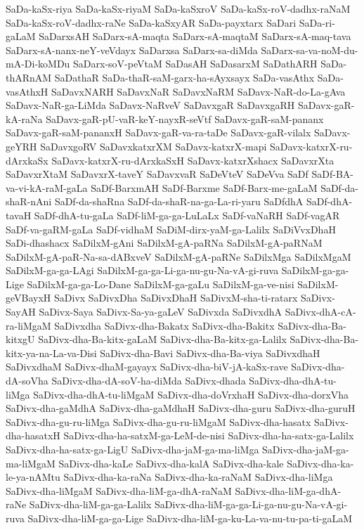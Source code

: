 {SaDa-kaSx-riya
SaDa-kaSx-riyaM
SaDa-kaSxroV
SaDa-kaSx-roV-dadhx-raNaM
SaDa-kaSx-roV-dadhx-raNe
SaDa-kaSxyAR
SaDa-payxtarx
SaDari
SaDa-ri-gaLaM
SaDarxsAH
SaDarx-sA-maqta
SaDarx-sA-maqtaM
SaDarx-sA-maq-tava
SaDarx-sA-nanx-neY-veVdayx
SaDarxsa
SaDarx-sa-diMda
SaDarx-sa-va-noM-du-mA-Di-koMDu
SaDarx-soV-peVtaM
SaDasAH
SaDasarxM
SaDathARH
SaDa-thARnAM
SaDathaR
SaDa-thaR-saM-garx-ha-sAyxsayx
SaDa-vasAthx
SaDa-vasAthxH
SaDavxNARH
SaDavxNaR
SaDavxNaRM
SaDavx-NaR-do-La-gAva
SaDavx-NaR-ga-LiMda
SaDavx-NaRveV
SaDavxgaR
SaDavxgaRH
SaDavx-gaR-kA-raNa
SaDavx-gaR-pU-vaR-keY-nayxR-seVtf
SaDavx-gaR-saM-pananx
SaDavx-gaR-saM-pananxH
SaDavx-gaR-va-ra-taDe
SaDavx-gaR-vilalx
SaDavx-geYRH
SaDavxgoRV
SaDavxkatxrXM
SaDavx-katxrX-mapi
SaDavx-katxrX-ru-dArxkaSx
SaDavx-katxrX-ru-dArxkaSxH
SaDavx-katxrXshacx
SaDavxrXta
SaDavxrXtaM
SaDavxrX-taveY
SaDavxvaR
SaDeVteV
SaDeVva
SaDf
SaDf-BA-va-vi-kA-raM-gaLa
SaDf-BarxmAH
SaDf-Barxme
SaDf-Barx-me-gaLaM
SaDf-da-shaR-nAni
SaDf-da-shaRna
SaDf-da-shaR-na-ga-La-ri-yaru
SaDfdhA
SaDf-dhA-tavaH
SaDf-dhA-tu-gaLa
SaDf-liM-ga-ga-LuLaLx
SaDf-vaNaRH
SaDf-vagAR
SaDf-va-gaRM-gaLa
SaDf-vidhaM
SaDiM-dirx-yaM-ga-Lalilx
SaDiVvxDhaH
SaDi-dhashacx
SaDilxM-gAni
SaDilxM-gA-paRNa
SaDilxM-gA-paRNaM
SaDilxM-gA-paR-Na-sa-dABxveV
SaDilxM-gA-paRNe
SaDilxMga
SaDilxMgaM
SaDilxM-ga-ga-LAgi
SaDilxM-ga-ga-Li-ga-nu-gu-Na-vA-gi-ruva
SaDilxM-ga-ga-Lige
SaDilxM-ga-ga-Lo-Dane
SaDilxM-ga-gaLu
SaDilxM-ga-ve-nisi
SaDilxM-geVBayxH
SaDivx
SaDivxDha
SaDivxDhaH
SaDivxM-sha-ti-ratarx
SaDivx-SayAH
SaDivx-Saya
SaDivx-Sa-ya-gaLeV
SaDivxda
SaDivxdhA
SaDivx-dhA-cA-ra-liMgaM
SaDivxdha
SaDivx-dha-Bakatx
SaDivx-dha-Bakitx
SaDivx-dha-Ba-kitxgU
SaDivx-dha-Ba-kitx-gaLaM
SaDivx-dha-Ba-kitx-ga-Lalilx
SaDivx-dha-Ba-kitx-ya-na-La-va-Disi
SaDivx-dha-Bavi
SaDivx-dha-Ba-viya
SaDivxdhaH
SaDivxdhaM
SaDivx-dhaM-gayayx
SaDivx-dha-biV-jA-kaSx-rave
SaDivx-dha-dA-soVha
SaDivx-dha-dA-soV-ha-diMda
SaDivx-dhada
SaDivx-dha-dhA-tu-liMga
SaDivx-dha-dhA-tu-liMgaM
SaDivx-dha-doVrxhaH
SaDivx-dha-dorxVha
SaDivx-dha-gaMdhA
SaDivx-dha-gaMdhaH
SaDivx-dha-guru
SaDivx-dha-guruH
SaDivx-dha-gu-ru-liMga
SaDivx-dha-gu-ru-liMgaM
SaDivx-dha-hasatx
SaDivx-dha-hasatxH
SaDivx-dha-ha-satxM-ga-LeM-de-nisi
SaDivx-dha-ha-satx-ga-Lalilx
SaDivx-dha-ha-satx-ga-LigU
SaDivx-dha-jaM-ga-ma-liMga
SaDivx-dha-jaM-ga-ma-liMgaM
SaDivx-dha-kaLe
SaDivx-dha-kalA
SaDivx-dha-kale
SaDivx-dha-ka-le-ya-nAMtu
SaDivx-dha-ka-raNa
SaDivx-dha-ka-raNaM
SaDivx-dha-liMga
SaDivx-dha-liMgaM
SaDivx-dha-liM-ga-dhA-raNaM
SaDivx-dha-liM-ga-dhA-raNe
SaDivx-dha-liM-ga-ga-Lalilx
SaDivx-dha-liM-ga-ga-Li-ga-nu-gu-Na-vA-gi-ruva
SaDivx-dha-liM-ga-ga-Lige
SaDivx-dha-liM-ga-ku-La-va-nu-tu-pa-ti-gaLaM
}

